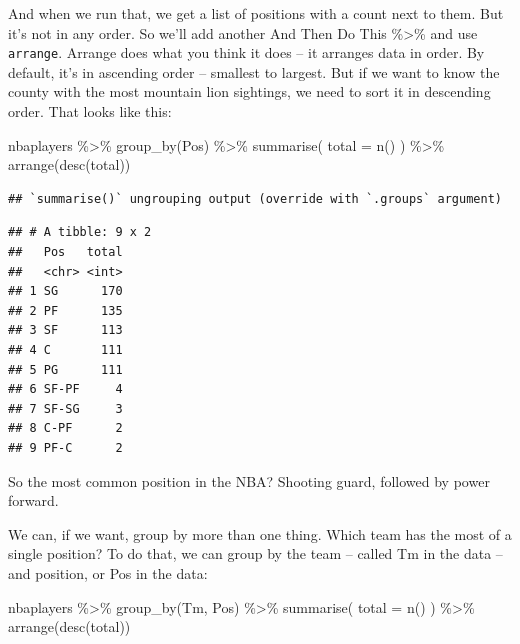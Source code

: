 \documentclass[
]{book}
\newenvironment{Shaded}{\begin{snugshade}}{\end{snugshade}}
\newcommand{\AttributeTok}[1]{\textcolor[rgb]{0.77,0.63,0.00}{#1}}
\newcommand{\FunctionTok}[1]{\textcolor[rgb]{0.00,0.00,0.00}{#1}}
\newcommand{\NormalTok}[1]{#1}
\newcommand{\SpecialCharTok}[1]{\textcolor[rgb]{0.00,0.00,0.00}{#1}}
\begin{document}
And when we run that, we get a list of positions with a count next to them. But it's not in any order. So we'll add another And Then Do This \%\textgreater\% and use \texttt{arrange}. Arrange does what you think it does -- it arranges data in order. By default, it's in ascending order -- smallest to largest. But if we want to know the county with the most mountain lion sightings, we need to sort it in descending order. That looks like this:

\begin{Shaded}
\begin{Highlighting}[]
\NormalTok{nbaplayers }\SpecialCharTok{\%\textgreater{}\%}
  \FunctionTok{group\_by}\NormalTok{(Pos) }\SpecialCharTok{\%\textgreater{}\%}
  \FunctionTok{summarise}\NormalTok{(}
    \AttributeTok{total =} \FunctionTok{n}\NormalTok{()}
\NormalTok{  ) }\SpecialCharTok{\%\textgreater{}\%} \FunctionTok{arrange}\NormalTok{(}\FunctionTok{desc}\NormalTok{(total))}
\end{Highlighting}
\end{Shaded}

\begin{verbatim}
## `summarise()` ungrouping output (override with `.groups` argument)
\end{verbatim}

\begin{verbatim}
## # A tibble: 9 x 2
##   Pos   total
##   <chr> <int>
## 1 SG      170
## 2 PF      135
## 3 SF      113
## 4 C       111
## 5 PG      111
## 6 SF-PF     4
## 7 SF-SG     3
## 8 C-PF      2
## 9 PF-C      2
\end{verbatim}

So the most common position in the NBA? Shooting guard, followed by power forward.

We can, if we want, group by more than one thing. Which team has the most of a single position? To do that, we can group by the team -- called Tm in the data -- and position, or Pos in the data:

\begin{Shaded}
\begin{Highlighting}[]
\NormalTok{nbaplayers }\SpecialCharTok{\%\textgreater{}\%}
  \FunctionTok{group\_by}\NormalTok{(Tm, Pos) }\SpecialCharTok{\%\textgreater{}\%}
  \FunctionTok{summarise}\NormalTok{(}
    \AttributeTok{total =} \FunctionTok{n}\NormalTok{()}
\NormalTok{  ) }\SpecialCharTok{\%\textgreater{}\%} \FunctionTok{arrange}\NormalTok{(}\FunctionTok{desc}\NormalTok{(total))}
\end{Highlighting}
\end{Shaded}
\end{document}
